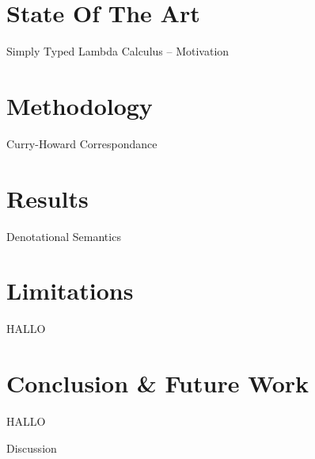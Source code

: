 \documentclass[aspectratio=1610,12pt]{beamer}
\begin{document}
\section{State Of The Art}
\begin{frame}[t, fragile]{Simply Typed Lambda Calculus -- Motivation}
\end{frame}

\section{Methodology}

\begin{frame}[t, fragile]{Curry-Howard Correspondance}
\end{frame}

\section{Results}
\begin{frame}[t]{Denotational Semantics}
\end{frame}

\section{Limitations}
\begin{frame}
  HALLO
\end{frame}

\section{Conclusion \& Future Work}
\begin{frame}
  HALLO
\end{frame}

\appendix

\begin{frame}{Discussion}
\end{frame}
\end{document}
